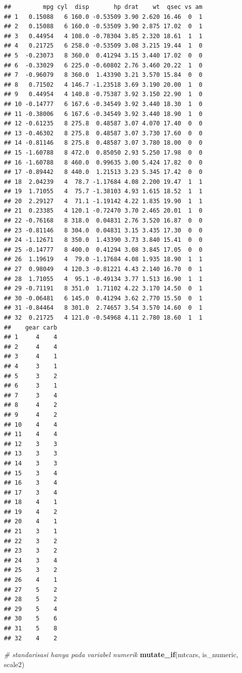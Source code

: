 \documentclass[]{book}
\newenvironment{Shaded}{\begin{snugshade}}{\end{snugshade}}
\newcommand{\KeywordTok}[1]{\textcolor[rgb]{0.13,0.29,0.53}{\textbf{#1}}}
\newcommand{\CommentTok}[1]{\textcolor[rgb]{0.56,0.35,0.01}{\textit{#1}}}
\newcommand{\NormalTok}[1]{#1}
\begin{document}
\begin{verbatim}
##         mpg cyl  disp       hp drat    wt  qsec vs am
## 1   0.15088   6 160.0 -0.53509 3.90 2.620 16.46  0  1
## 2   0.15088   6 160.0 -0.53509 3.90 2.875 17.02  0  1
## 3   0.44954   4 108.0 -0.78304 3.85 2.320 18.61  1  1
## 4   0.21725   6 258.0 -0.53509 3.08 3.215 19.44  1  0
## 5  -0.23073   8 360.0  0.41294 3.15 3.440 17.02  0  0
## 6  -0.33029   6 225.0 -0.60802 2.76 3.460 20.22  1  0
## 7  -0.96079   8 360.0  1.43390 3.21 3.570 15.84  0  0
## 8   0.71502   4 146.7 -1.23518 3.69 3.190 20.00  1  0
## 9   0.44954   4 140.8 -0.75387 3.92 3.150 22.90  1  0
## 10 -0.14777   6 167.6 -0.34549 3.92 3.440 18.30  1  0
## 11 -0.38006   6 167.6 -0.34549 3.92 3.440 18.90  1  0
## 12 -0.61235   8 275.8  0.48587 3.07 4.070 17.40  0  0
## 13 -0.46302   8 275.8  0.48587 3.07 3.730 17.60  0  0
## 14 -0.81146   8 275.8  0.48587 3.07 3.780 18.00  0  0
## 15 -1.60788   8 472.0  0.85050 2.93 5.250 17.98  0  0
## 16 -1.60788   8 460.0  0.99635 3.00 5.424 17.82  0  0
## 17 -0.89442   8 440.0  1.21513 3.23 5.345 17.42  0  0
## 18  2.04239   4  78.7 -1.17684 4.08 2.200 19.47  1  1
## 19  1.71055   4  75.7 -1.38103 4.93 1.615 18.52  1  1
## 20  2.29127   4  71.1 -1.19142 4.22 1.835 19.90  1  1
## 21  0.23385   4 120.1 -0.72470 3.70 2.465 20.01  1  0
## 22 -0.76168   8 318.0  0.04831 2.76 3.520 16.87  0  0
## 23 -0.81146   8 304.0  0.04831 3.15 3.435 17.30  0  0
## 24 -1.12671   8 350.0  1.43390 3.73 3.840 15.41  0  0
## 25 -0.14777   8 400.0  0.41294 3.08 3.845 17.05  0  0
## 26  1.19619   4  79.0 -1.17684 4.08 1.935 18.90  1  1
## 27  0.98049   4 120.3 -0.81221 4.43 2.140 16.70  0  1
## 28  1.71055   4  95.1 -0.49134 3.77 1.513 16.90  1  1
## 29 -0.71191   8 351.0  1.71102 4.22 3.170 14.50  0  1
## 30 -0.06481   6 145.0  0.41294 3.62 2.770 15.50  0  1
## 31 -0.84464   8 301.0  2.74657 3.54 3.570 14.60  0  1
## 32  0.21725   4 121.0 -0.54968 4.11 2.780 18.60  1  1
##    gear carb
## 1     4    4
## 2     4    4
## 3     4    1
## 4     3    1
## 5     3    2
## 6     3    1
## 7     3    4
## 8     4    2
## 9     4    2
## 10    4    4
## 11    4    4
## 12    3    3
## 13    3    3
## 14    3    3
## 15    3    4
## 16    3    4
## 17    3    4
## 18    4    1
## 19    4    2
## 20    4    1
## 21    3    1
## 22    3    2
## 23    3    2
## 24    3    4
## 25    3    2
## 26    4    1
## 27    5    2
## 28    5    2
## 29    5    4
## 30    5    6
## 31    5    8
## 32    4    2
\end{verbatim}

\begin{Shaded}
\begin{Highlighting}[]
\CommentTok{# standarisasi hanya pada variabel numerik}
\KeywordTok{mutate_if}\NormalTok{(mtcars, is_numeric, scale2)}
\end{Highlighting}
\end{Shaded}
\end{document}
